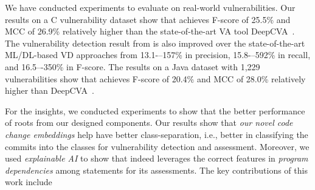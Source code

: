 

We have conducted experiments to evaluate {\tool} on real-world
vulnerabilities. Our results on a C vulnerability dataset
show that {\tool} achieves F-score of 25.5\% and MCC of 26.9\%
relatively higher than the state-of-the-art VA tool
DeepCVA~\cite{deepCVA-ase21}.  The vulnerability detection result from
{\tool} is also improved over the state-of-the-art ML/DL-based VD
approaches from 13.1-–157\% in precision, 15.8-–592\% in recall,
and 16.5–-350\% in F-score.
The results on a Java dataset with 1,229 vulnerabilities show that
{\tool} achieves F-score of 20.4\% and MCC of 28.0\% relatively higher
than DeepCVA~\cite{deepCVA-ase21}.


For the insights, we conducted experiments to show that the better
performance of {\tool} roots from our designed components.
Our results show that {\em our novel code change embeddings} help
{\tool} have better class-separation, i.e., better in classifying the
commits into the classes for vulnerability detection and
assessment. Moreover, we used {\em explainable AI} to show
that {\tool} indeed leverages the correct features in {\em program
  dependencies} among statements for its assessments.
The key contributions of this work include

